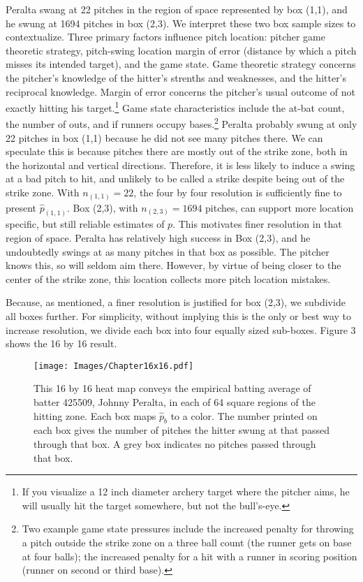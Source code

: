 \documentclass{article}
\begin{document}
Peralta swang at 22 pitches in the region of space represented by box (1,1), and he swung at 1694 pitches in box (2,3). We interpret these two box sample sizes to contextualize. Three primary factors influence pitch location: pitcher game theoretic strategy, pitch-swing location margin of error (distance by which a pitch misses its intended target), and the game state. Game theoretic strategy concerns the pitcher's knowledge of the hitter's strenths and weaknesses, and the hitter's reciprocal knowledge. Margin of error concerns the pitcher's usual outcome of not exactly hitting his target.\footnote{If you visualize a 12 inch diameter archery target where the pitcher aims, he will usually hit the target somewhere, but not the bull's-eye.} Game state characteristics include the at-bat count, the number of outs, and if runners occupy bases.\footnote{Two example game state pressures include the increased penalty for throwing a pitch outside the strike zone on a three ball count (the runner gets on base at four balls); the increased penalty for a hit with a runner in scoring position (runner on second or third base).} Peralta probably swung at only 22 pitches in box (1,1) because he did not see many pitches there. We can speculate this is because pitches there are mostly out of the strike zone, both in the horizontal and vertical directions. Therefore, it is less likely to induce a swing at a bad pitch to hit, and unlikely to be called a strike despite being out of the strike zone. With $n_{(1,1)}=22$, the four by four resolution is sufficiently fine to present $\hat{p}_{(1,1)}$. Box (2,3), with $n_{(2,3)} = 1694$ pitches, can support more location specific, but still reliable estimates of $p$. This motivates finer resolution in that region of space. Peralta has relatively high success in Box (2,3), and he undoubtedly swings at as many pitches in that box as possible. The pitcher knows this, so will seldom aim there. However, by virtue of being closer to the center of the strike zone, this location collects more pitch location mistakes.

Because, as mentioned, a finer resolution is justified for box (2,3), we subdivide all boxes further. For simplicity, without implying this is the only or best way to increase resolution, we divide each box into four equally sized sub-boxes. Figure 3 shows the 16 by 16 result.
        \begin{figure}[H]
      	\centering
      	\texttt{[image: Images/Chapter16x16.pdf]} 
      	\caption{This 16 by 16 heat map conveys the empirical batting average of batter 425509, Johnny Peralta, in each of 64 square regions of the hitting zone. Each box maps $\hat{p}_{b}$ to a color. The number printed on each box gives the number of pitches the hitter swung at that passed through that box. A grey box indicates no pitches passed through that box.}
      	\end{figure} 
\end{document}
